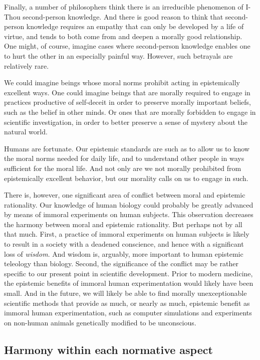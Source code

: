 Finally, a number of philosophers think there is an irreducible phenomenon of I-Thou second-person knowledge. And there is good
reason to think that second-person knowledge requires an empathy that can only be developed by a life of virtue, and 
tends to both come from and deepen a morally good relationship. One might, of course, imagine cases where second-person 
knowledge enables one to hurt the other in an especially painful way. However, such betrayals are relatively rare.

We could imagine beings whose moral norms prohibit acting in epistemically excellent ways. One could imagine
beings that are morally required to engage in practices productive of self-deceit in order to preserve morally important
beliefs, such as the belief in other minds. Or ones that are morally forbidden to engage in scientific investigation,
in order to better preserve a sense of mystery about the natural world.

Humans are fortunate. Our epistemic standards are such as to allow us to know the moral norms needed for daily life, 
and to understand other people in ways sufficient for the moral life. And not only are we not morally prohibited from 
epistemically excellent behavior, but our morality calls on us to engage in such.

There is, however, one significant area of conflict between moral and epistemic rationality. Our knowledge of human 
biology could probably be greatly advanced by means of immoral experiments on human subjects. This observation decreases
the harmony between moral and epistemic rationality. But perhaps not by all that much. First, a practice of immoral 
experiments on human subjects is likely to result in a society with a deadened conscience, and hence with a significant
loss of \textit{wisdom}. And wisdom is, arguably, more important to human epistemic teleology than biology. Second,
the significance of the conflict may be rather specific to our present point in scientific development. Prior to 
modern medicine, the epistemic benefits of immoral human experimentation would likely have been small. And in the 
future, we will likely be able to find morally unexceptionable scientific methods that provide as much, or nearly as much, epistemic
benefit as immoral human experimentation, such as computer simulations and experiments on non-human animals genetically 
modified to be unconscious.

\subsection{Harmony within each normative aspect}
